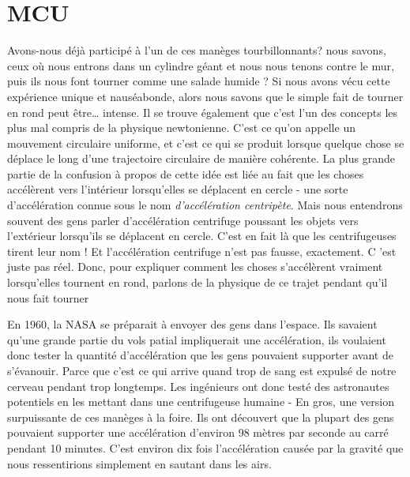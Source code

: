 \hypertarget{mcu}{%
\section{MCU}\label{mcu}}

Avons-nous déjà participé à l'un de ces manèges tourbillonnants? nous
savons, ceux où nous entrons dans un cylindre géant et nous nous tenons
contre le mur, puis ils nous font tourner comme une salade humide ? Si
nous avons vécu cette expérience unique et nauséabonde, alors nous
savons que le simple fait de tourner en rond peut être\ldots{} intense.
Il se trouve également que c'est l'un des concepts les plus mal compris
de la physique newtonienne. C'est ce qu'on appelle un mouvement
circulaire uniforme, et c'est ce qui se produit lorsque quelque chose se
déplace le long d'une trajectoire circulaire de manière cohérente. La
plus grande partie de la confusion à propos de cette idée est liée au
fait que les choses accélèrent vers l'intérieur lorsqu'elles se
déplacent en cercle - une sorte d'accélération connue sous le nom
\emph{d'accélération centripète}. Mais nous entendrons souvent des gens
parler d'accélération centrifuge poussant les objets vers l'extérieur
lorsqu'ils se déplacent en cercle. C'est en fait là que les
centrifugeuses tirent leur nom ! Et l'accélération centrifuge n'est pas
fausse, exactement. C 'est juste pas réel. Donc, pour expliquer comment
les choses s'accélèrent vraiment lorsqu'elles tournent en rond, parlons
de la physique de ce trajet pendant qu'il nous fait tourner

En 1960, la NASA se préparait à envoyer des gens dans l'espace. Ils
savaient qu'une grande partie du vols patial impliquerait une
accélération, ils voulaient donc tester la quantité d'accélération que
les gens pouvaient supporter avant de s'évanouir. Parce que c'est ce qui
arrive quand trop de sang est expulsé de notre cerveau pendant trop
longtemps. Les ingénieurs ont donc testé des astronautes potentiels en
les mettant dans une centrifugeuse humaine - En gros, une version
surpuissante de ces manèges à la foire. Ils ont découvert que la plupart
des gens pouvaient supporter une accélération d'environ 98 mètres par
seconde au carré pendant 10 minutes. C'est environ dix fois
l'accélération causée par la gravité que nous ressentirions simplement
en sautant dans les airs.

